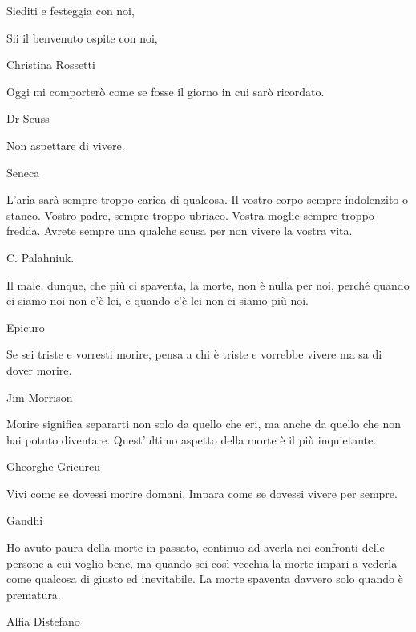 \documentclass[12pt]{book} %
\begin{document}
\begin{mdframed}[linewidth=1pt]
Siediti e festeggia con noi, 

Sii il benvenuto ospite con noi, 

Christina Rossetti


\bigskip

Oggi mi comporterò come se fosse il giorno in cui sarò ricordato.

Dr Seuss

\bigskip

Non aspettare di vivere.

Seneca


\bigskip

L'aria sarà sempre troppo carica di qualcosa. Il vostro corpo sempre indolenzito o stanco. Vostro
padre, sempre troppo ubriaco. Vostra moglie sempre troppo fredda. Avrete sempre una qualche scusa per non vivere la
vostra vita.

C. Palahniuk.


\bigskip

Il male, dunque, che più ci spaventa, la morte, non è nulla per noi, perché quando ci siamo noi non c'è lei, e quando
c'è lei non ci siamo più noi. 

Epicuro

\bigskip

Se sei triste e vorresti morire, pensa a chi è triste e vorrebbe vivere ma sa di dover morire.

Jim Morrison

\bigskip

Morire significa separarti non solo da quello che eri, ma anche da quello che non hai potuto diventare. Quest’ultimo aspetto della morte è il più inquietante.

Gheorghe Gricurcu

\bigskip

Vivi come se dovessi morire domani. Impara come se dovessi vivere per sempre.

Gandhi

\bigskip

Ho avuto paura della morte in passato, continuo ad averla nei confronti delle persone a cui voglio bene, ma quando sei così vecchia la morte impari a vederla come qualcosa di giusto ed inevitabile. La morte spaventa davvero solo quando è prematura. 

Alfia Distefano
\end{mdframed}
\end{document}
